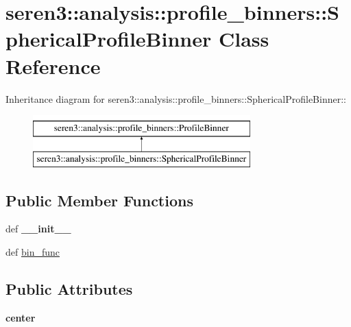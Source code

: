 \hypertarget{classseren3_1_1analysis_1_1profile__binners_1_1SphericalProfileBinner}{
\section{seren3::analysis::profile\_\-binners::SphericalProfileBinner Class Reference}
\label{classseren3_1_1analysis_1_1profile__binners_1_1SphericalProfileBinner}
}
Inheritance diagram for seren3::analysis::profile\_\-binners::SphericalProfileBinner::\begin{figure}[H]
\begin{center}
\leavevmode
\includegraphics[height=2cm]{classseren3_1_1analysis_1_1profile__binners_1_1SphericalProfileBinner}
\end{center}
\end{figure}
\subsection*{Public Member Functions}
\begin{DoxyCompactItemize}
\item 
\hypertarget{classseren3_1_1analysis_1_1profile__binners_1_1SphericalProfileBinner_a800468a5368ce42b9c1d10f3e96394d7}{
def {\bfseries \_\-\_\-init\_\-\_\-}}
\label{classseren3_1_1analysis_1_1profile__binners_1_1SphericalProfileBinner_a800468a5368ce42b9c1d10f3e96394d7}

\item 
def \hyperlink{classseren3_1_1analysis_1_1profile__binners_1_1SphericalProfileBinner_a3aee2654d4212ebb91eaef43be33792b}{bin\_\-func}
\end{DoxyCompactItemize}
\subsection*{Public Attributes}
\begin{DoxyCompactItemize}
\item 
\hypertarget{classseren3_1_1analysis_1_1profile__binners_1_1SphericalProfileBinner_af5f97a6f8a8e4534bc8d9866762bd30e}{
{\bfseries center}}
\label{classseren3_1_1analysis_1_1profile__binners_1_1SphericalProfileBinner_af5f97a6f8a8e4534bc8d9866762bd30e}

\end{DoxyCompactItemize}


